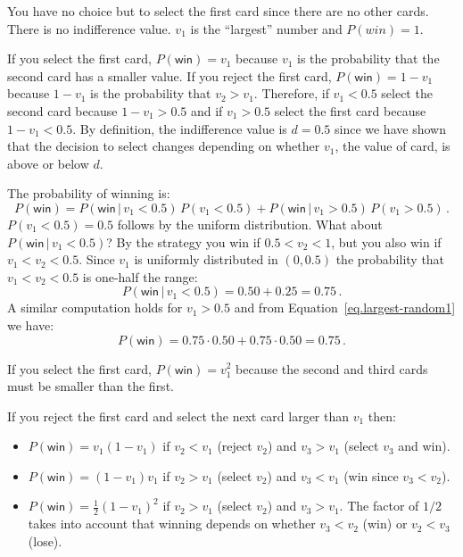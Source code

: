  You have no choice but to select the first card since there are no other cards. There is no indifference value. $v_1$ is the ``largest'' number and $P({win})=1$.

 If you select the first card, $P(\textsf{win})=v_1$ because $v_1$ is the probability that the second card has a smaller value. If you reject the first card, $P(\textsf{win})=1-v_1$ because $1-v_1$ is the probability that $v_2>v_1$. Therefore, if $v_1<0.5$ select the second card because $1-v_1>0.5$ and if $v_1>0.5$ select the first card because $1-v_1<0.5$. By definition, the indifference value is $d=0.5$ since we have shown that the decision to select changes depending on whether $v_1$, the value of card, is above or below $d$.

The probability of winning is:
\begin{equation}\label{eq.largest-random1}
P(\textsf{win}) = P(\textsf{win} \,|\,v_1<0.5)\,P(v_1<0.5)+ P(\textsf{win}\,|\,v_1>0.5)\,P(v_1>0.5)\,.
\end{equation}
$P(v_1<0.5)=0.5$ follows by the uniform distribution. What about $P(\textsf{win} \,|\,v_1<0.5)$? By the strategy you win if $0.5<v_2<1$, but you also win if $v_1<v_2<0.5$. Since $v_1$ is uniformly distributed in $(0,0.5)$ the probability that $v_1<v_2<0.5$ is one-half the range:
\[
P(\textsf{win} \,|\,v_1<0.5)=0.50+0.25=0.75\,.
\]
A similar computation holds for $v_1>0.5$ and from Equation~\ref{eq.largest-random1} we have:
\[
P(\textsf{win})=0.75\cdot 0.50 + 0.75\cdot 0.50=0.75\,.
\]


If you select the first card, $P(\textsf{win})=v_1^2$ because the second and third cards must be smaller than the first.

If you reject the first card and select the next card larger than $v_1$ then:
\begin{itemize}
\item $P(\textsf{win})=v_1(1-v_1)$ if $v_2<v_1$ (reject $v_2$) and $v_3>v_1$ (select $v_3$ and win).
\item $P(\textsf{win})=(1-v_1)v_1$ if $v_2>v_1$ (select $v_2$) and $v_3<v_1$ (win since $v_3<v_2$).
\item $P(\textsf{win})=\frac{1}{2}(1-v_1)^2$ if $v_2>v_1$ (select $v_2$) and $v_3>v_1$. The factor of $1/2$ takes into account that winning depends on whether $v_3<v_2$ (win) or $v_2<v_3$ (lose).
\end{itemize}


